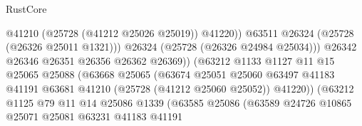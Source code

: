 \begin{lexlean}{RustCore}
\begin{coremodule}
                                                  @41210
                                                  (@25728 (@41212 @25026 @25019))
                                                  @41220))
                                              @63511
                                              @26324
                                              (@25728 (@26326 @25011 @1321)))
                                            @26324
                                            (@25728 (@26326 @24984 @25034)))
                                          @26342
                                          @26346
                                          @26351
                                          @26356
                                          @26362
                                          @26369))
                                      (@63212
                                        @1133
                                        @1127
                                        @11
                                        @15
                                        @25065
                                        @25088
                                        (@63668
                                          @25065
                                          (@63674
                                            @25051
                                            @25060
                                            @63497
                                            @41183
                                            @41191
                                            @63681
                                            @41210
                                            (@25728 (@41212 @25060 @25052))
                                            @41220))
                                        (@63212
                                          @1125
                                          @79
                                          @11
                                          @14
                                          @25086
                                          @1339
                                          (@63585
                                            @25086
                                            (@63589
                                              @24726
                                              @10865
                                              @25071
                                              @25081
                                              @63231
                                              @41183
                                              @41191

\end{coremodule}
\end{lexlean}
